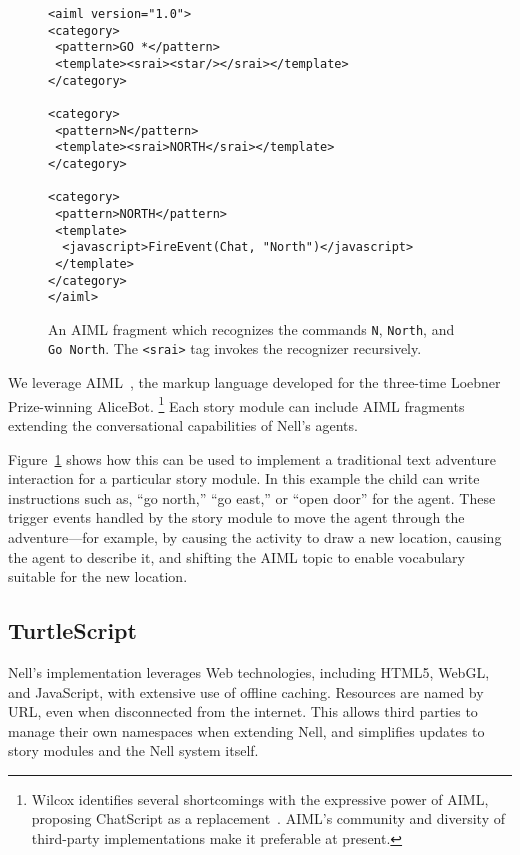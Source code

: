 \documentclass[preprint]{sig-alternate}
\begin{document}
\begin{figure}\small
\begin{verbatim}
<aiml version="1.0">
<category>
 <pattern>GO *</pattern>
 <template><srai><star/></srai></template>
</category>

<category>
 <pattern>N</pattern>
 <template><srai>NORTH</srai></template>
</category>

<category>
 <pattern>NORTH</pattern>
 <template>
  <javascript>FireEvent(Chat, "North")</javascript>
 </template>
</category>
</aiml>
\end{verbatim}
\caption{An AIML fragment which recognizes the commands \texttt{N},
  \texttt{North}, and \texttt{Go North}. The \texttt{<srai>} tag invokes the
  recognizer recursively.}\label{fig:aiml}
\end{figure}

We leverage AIML~\cite{aiml:2005},
the markup language developed for the three-time Loebner Prize-winning
AliceBot.%
\footnote{Wilcox identifies several shortcomings with the expressive
  power of AIML, proposing ChatScript as a
  replacement~\cite{wilcox:2010}.  AIML's community and
  diversity of third-party implementations make it preferable at present.}
Each story module can include AIML fragments extending the
conversational capabilities of Nell's agents.

Figure~\ref{fig:aiml}
shows how this can be used to implement a traditional
text adventure interaction for a particular story module.
In this example the child can write instructions such as, ``go north,'' ``go
east,'' or ``open door'' for the agent.  These trigger events
handled by the story module to move the agent through the
adventure---for example, by causing the activity to draw a
new location, causing the agent to describe it, and shifting the
AIML topic to enable vocabulary suitable for the new location.


\subsection{TurtleScript}\label{sec:turtles}
Nell's implementation leverages Web technologies, including HTML5,
WebGL, and JavaScript, with extensive use of offline caching.
Resources are named by URL, even when disconnected from the
internet.  This allows third parties to manage their own namespaces
when extending Nell, and simplifies updates to story modules and
the Nell system itself.
\end{document}

